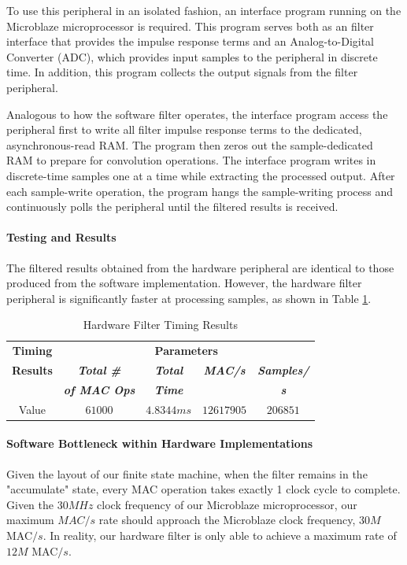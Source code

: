 \documentclass[conference]{IEEEtran}
\begin{document}
To use this peripheral in an isolated fashion, an interface program running on the Microblaze\textregistered{} microprocessor is required. This program serves both as an filter interface that provides the impulse response terms and an Analog-to-Digital Converter (ADC), which provides input samples to the peripheral in discrete time. In addition, this program collects the output signals from the filter peripheral.

Analogous to how the software filter operates, the interface program access the peripheral first to write all filter impulse response terms to the dedicated, asynchronous-read RAM. The program then zeros out the sample-dedicated RAM to prepare for convolution operations. The interface program writes in discrete-time samples one at a time while extracting the processed output. After each sample-write operation, the program hangs the sample-writing process and continuously polls the peripheral until the filtered results is received.

\paragraph{Testing and Results} The filtered results obtained from the hardware peripheral are identical to those produced from the software implementation. However, the hardware filter peripheral is significantly faster at processing samples, as shown in Table \ref{hardware_timing}.


\begin{table}[htbp]
\caption{Hardware Filter Timing Results}
\begin{center}
\begin{tabular}{|c|c|c|c|c|}
\hline
\textbf{Timing}&\multicolumn{4}{|c|}{\textbf{Parameters}} \\
\cline{2-5} 
\textbf{Results} & \textbf{\textit{Total \#}}& \textbf{\textit{Total}}& \textbf{\textit{MAC/s}} & \textbf{\textit{Samples/}} \\
 & \textbf{\textit{of MAC Ops}} & \textbf{\textit{Time}} &  & \textbf{\textit{s}} \\
\hline
Value & $61000$ & $4.8344ms$ & $12617905$ & $206851$\\
\hline
\end{tabular}
\label{hardware_timing}
\end{center}
\end{table}

\paragraph{Software Bottleneck within Hardware Implementations} Given the layout of our finite state machine, when the filter remains in the "accumulate" state, every MAC operation takes exactly 1 clock cycle to complete. Given the $30MHz$ clock frequency of our Microblaze \textregistered microprocessor, our maximum $MAC/s$ rate should approach the Microblaze clock frequency, $30M$ MAC$/s$. In reality, our hardware filter is only able to achieve a maximum rate of $12M$ MAC$/s$. 
\end{document}
